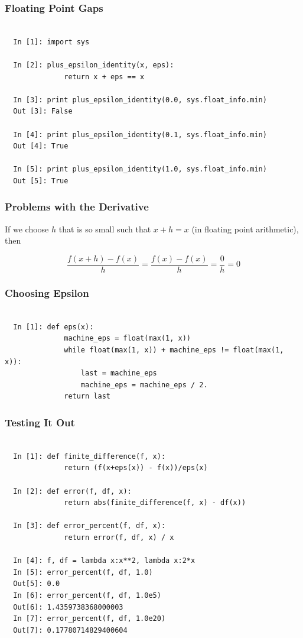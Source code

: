 \documentclass{beamer}
\begin{document}
\begin{frame}[fragile]
\frametitle{Floating Point Gaps}

\begin{lstlisting}

  In [1]: import sys

  In [2]: plus_epsilon_identity(x, eps):
              return x + eps == x

  In [3]: print plus_epsilon_identity(0.0, sys.float_info.min)
  Out [3]: False

  In [4]: print plus_epsilon_identity(0.1, sys.float_info.min)
  Out [4]: True

  In [5]: print plus_epsilon_identity(1.0, sys.float_info.min)
  Out [5]: True

\end{lstlisting}

\end{frame}

\begin{frame}
\frametitle{Problems with the Derivative}

If we choose $h$ that is so small such that $x + h = x$ (in floating point arithmetic), then

\[ \frac{f(x+h) - f(x)}{h} = \frac{f(x) - f(x)}{h} = \frac{0}{h} = 0 \]

\end{frame}


\begin{frame}[fragile]
\frametitle{Choosing Epsilon}

\begin{lstlisting}

  In [1]: def eps(x):
              machine_eps = float(max(1, x))
              while float(max(1, x)) + machine_eps != float(max(1, x)):
                  last = machine_eps
                  machine_eps = machine_eps / 2.
              return last

\end{lstlisting}

\end{frame}


\begin{frame}[fragile]
\frametitle{Testing It Out}

\begin{lstlisting}

  In [1]: def finite_difference(f, x):
              return (f(x+eps(x)) - f(x))/eps(x)

  In [2]: def error(f, df, x):
              return abs(finite_difference(f, x) - df(x))

  In [3]: def error_percent(f, df, x):
              return error(f, df, x) / x

  In [4]: f, df = lambda x:x**2, lambda x:2*x
  In [5]: error_percent(f, df, 1.0)
  Out[5]: 0.0
  In [6]: error_percent(f, df, 1.0e5)
  Out[6]: 1.4359738368000003
  In [7]: error_percent(f, df, 1.0e20)
  Out[7]: 0.17780714829400604
\end{lstlisting}

\end{frame}
\end{document}
